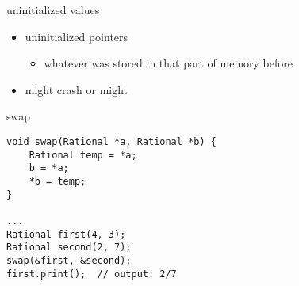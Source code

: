 \begin{frame}[fragile,label=uninitialized]{uninitialized values}
\lstset{language=C++,style=small}
    \begin{itemize}
        \item uninitialized pointers 
            \begin{itemize}
            \item whatever was stored in that part of memory before
            \end{itemize}
        \item might crash or might 
    \end{itemize}
\end{frame}


\begin{frame}[fragile,label=swap]{swap}
\lstset{language=C++,style=smaller}
\begin{lstlisting}
void swap(Rational *a, Rational *b) {
    Rational temp = *a;
    b = *a;
    *b = temp;
}

...
Rational first(4, 3);
Rational second(2, 7);
swap(&first, &second);
first.print();  // output: 2/7
\end{lstlisting}
\end{frame}
